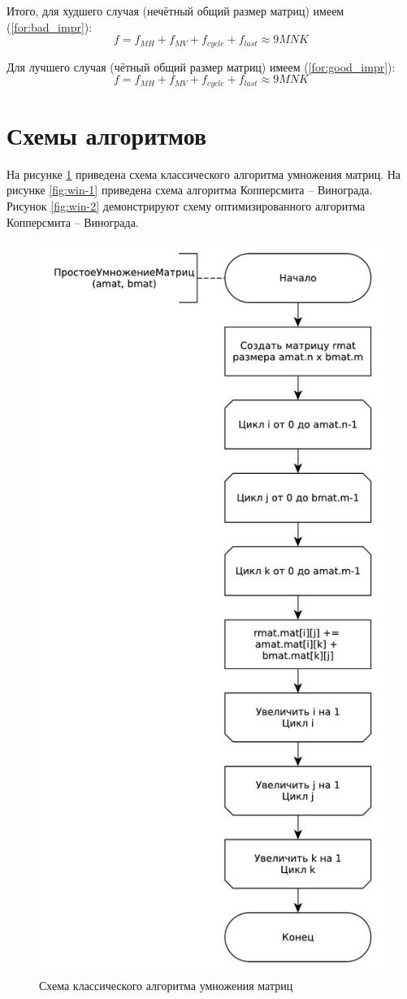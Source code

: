 Итого, для худшего случая (нечётный общий размер матриц) имеем (\ref{for:bad_impr}):
\begin{equation}
	\label{for:bad_impr}
	f = f_{MH} + f_{MV} + f_{cycle} + f_{last} \approx 9MNK
\end{equation}

Для лучшего случая (чётный общий размер матриц) имеем (\ref{for:good_impr}):
\begin{equation}
	\label{for:good_impr}
	f = f_{MH} + f_{MV} + f_{cycle} + f_{last} \approx 9MNK
\end{equation}

\section{Схемы алгоритмов}
На рисунке \ref{fig:alg} приведена схема классического алгоритма умножения матриц. На рисунке \ref{fig:win-1} приведена схема алгоритма Копперсмита -- Винограда. Рисунок  
\ref{fig:win-2} демонстрируют схему оптимизированного алгоритма Копперсмита -- Винограда.\newpage

\begin{figure}[ht!]
	\centering
	\includegraphics[width=0.65\linewidth]{assets/mtx-alg.pdf}
	\caption{Схема классического алгоритма умножения матриц}
	\label{fig:alg}
\end{figure}

